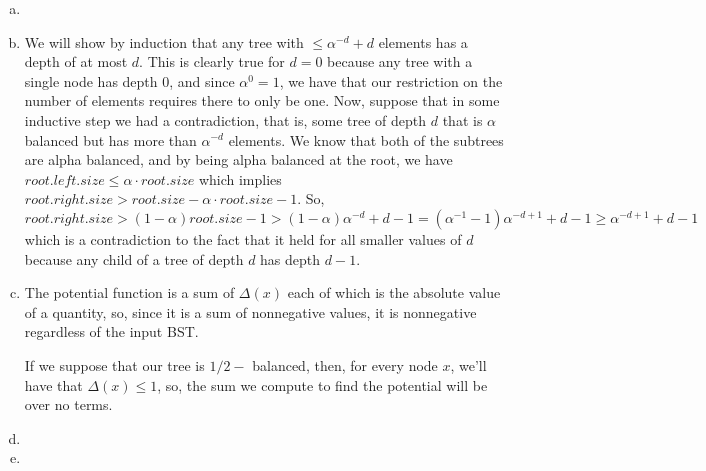 \documentclass{article}
\begin{document}
\begin{enumerate}[a.]%
\item

\item
We will show by induction that any tree with $\le \alpha^{-d}+d$ elements has a depth of at most $d$. This is clearly true for $d=0$ because any tree with a single node has depth 0, and since $\alpha^0 = 1$, we have that our restriction on the number of elements requires there to only be one. Now, suppose that in some inductive step we had a contradiction, that is, some tree of depth $d$ that is $\alpha$ balanced but has more than $\alpha^{-d}$ elements. We know that both of the subtrees are alpha balanced, and by being alpha balanced at the root, we have $root.left.size \le \alpha \cdot root.size$ which implies $root.right.size > root.size - \alpha \cdot root.size -1$. So, $root.right.size > (1-\alpha) root.size -1 > (1-\alpha) \alpha^{-d} + d-1 = (\alpha^{-1} -1)\alpha^{-d+1} + d-1 \ge \alpha^{-d+1}+d-1$ which is a contradiction to the fact that it held for all smaller values of $d$ because any child of a tree of depth $d$ has depth $d-1$.  
 \item
The potential function is a sum of $\Delta(x)$ each of which is the absolute value of a quantity, so, since it is a sum of nonnegative values, it is nonnegative regardless of the input BST.

If we suppose that our tree is $1/2-$ balanced, then, for every node $x$, we'll have that $\Delta(x) \le 1$, so, the sum we compute to find the potential will be over no terms.
 
 \item
 
 
 \item
 
\end{enumerate}
\end{document}
